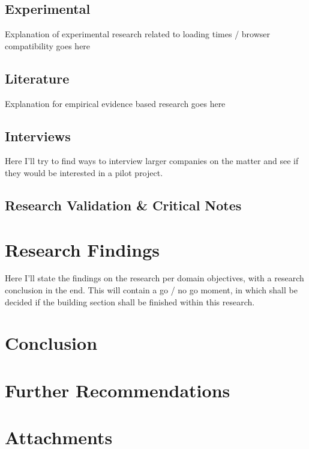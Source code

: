 \documentclass[signatures]{Thesis}
\begin{document}
    \section{Experimental}
    Explanation of experimental research related to loading times / browser compatibility goes here
    \section{Literature}
    Explanation for empirical evidence based research goes here
    \section{Interviews}
    Here I'll try to find ways to interview larger companies on the matter and see if they would be interested in a pilot project.
    
    \section{Research Validation \& Critical Notes}
    
    
\chapter{Research Findings}
Here I'll state the findings on the research per domain objectives, with a research conclusion in the end.
	This will contain a go / no go moment, in which shall be decided if the building section shall be finished within this research.
	

\chapter{Conclusion}

\chapter{Further Recommendations}

\chapter{Attachments}


\end{document}
